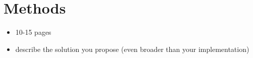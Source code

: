 \section{Methods}
\label{sec:methods}

\begin{itemize} 
    \item 10-15 pages
    \item describe the solution you propose (even broader than your implementation)
\end{itemize}